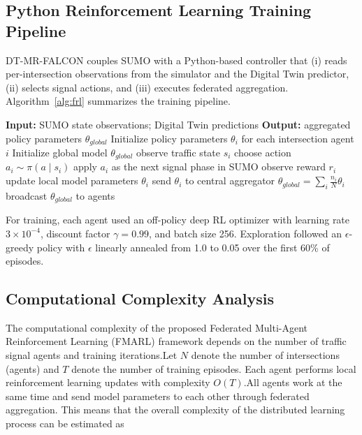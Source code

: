 \documentclass[conference]{IEEEtran}
\begin{document}
\subsection{Python Reinforcement Learning Training Pipeline}
DT-MR-FALCON couples SUMO with a Python-based controller that (i) reads per-intersection observations from the simulator and the Digital Twin predictor, (ii) selects signal actions, and (iii) executes federated aggregation. Algorithm~\ref{alg:frl} summarizes the training pipeline.

\begin{algorithm}[t]
\caption{Federated Multi-Agent RL Training}
\label{alg:frl}
\begin{algorithmic}[1]
\Statex \textbf{Input:} SUMO state observations; Digital Twin predictions
\Statex \textbf{Output:} aggregated policy parameters $\theta_{global}$
\State Initialize policy parameters $\theta_i$ for each intersection agent $i$
\State Initialize global model $\theta_{global}$
    \State observe traffic state $s_i$
    \State choose action $a_i \sim \pi(a\mid s_i)$
    \State apply $a_i$ as the next signal phase in SUMO
    \State observe reward $r_i$
    \State update local model parameters $\theta_i$
  \EndFor
  \State send $\theta_i$ to central aggregator
  \State $\theta_{global} = \sum_i \frac{n_i}{N}\theta_i$ 
  \State broadcast $\theta_{global}$ to agents
\EndFor
\end{algorithmic}
\end{algorithm}
For training, each agent used an off-policy deep RL optimizer with learning rate $3\times 10^{-4}$, discount factor $\gamma=0.99$, and batch size 256. Exploration followed an $\epsilon$-greedy policy with $\epsilon$ linearly annealed from 1.0 to 0.05 over the first 60\% of episodes.

\subsection*{Computational Complexity Analysis}

The computational complexity of the proposed Federated Multi-Agent Reinforcement Learning (FMARL) framework depends on the number of traffic signal agents and training iterations.Let $N$ denote the number of intersections (agents) and $T$ denote the number of training episodes.
Each agent performs local reinforcement learning updates with complexity $O(T)$.All agents work at the same time and send model parameters to each other through federated aggregation. This means that the overall complexity of the distributed learning process can be estimated as
\end{document}
